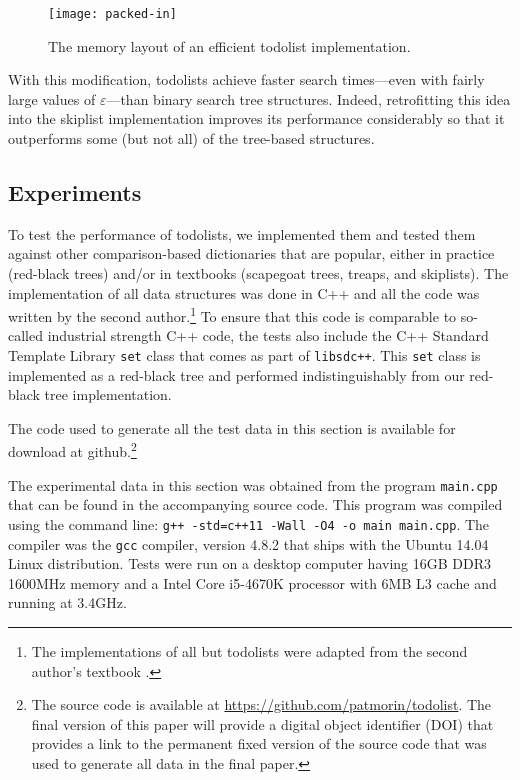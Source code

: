 \documentclass{patmorin}
\newcommand{\eps}{\varepsilon}
\begin{document}
\begin{figure}
   \centerline{\texttt{[image: packed-in]}}
   \caption{The memory layout of an efficient todolist implementation.}
\end{figure}

With this modification, todolists achieve faster search times---even with
fairly large values of $\eps$---than binary search tree structures. Indeed,
retrofitting this idea into the skiplist implementation improves its
performance considerably so that it outperforms some (but not all)
of the tree-based structures.

\subsection{Experiments}

To test the performance of todolists, we implemented them and tested them
against other comparison-based dictionaries that are popular, either in
practice (red-black trees) and/or in textbooks (scapegoat trees, treaps,
and skiplists).  The implementation of all data structures was done in
C++ and all the code was written by the second author.\footnote{The
implementations of all but todolists were adapted from the second
author's textbook \cite{morin:open}.}  To ensure that this code is
comparable to so-called industrial strength C++ code, the tests also
include the C++ Standard Template Library \texttt{set} class that comes
as part of \texttt{libsdc++}.  This \texttt{set} class is implemented
as a red-black tree and performed indistinguishably from our red-black
tree implementation.

The code used to generate all the test data in this section is available
for download at github.\footnote{The source code is available at
\url{https://github.com/patmorin/todolist}. The final version of this
paper will provide a digital object identifier (DOI) that provides a
link to the permanent fixed version of the source code that was used to
generate all data in the final paper.}

The experimental data in this section was obtained from the program
\texttt{main.cpp} that can be found in the accompanying source code.
This program was compiled using the command line: \texttt{g++ -std=c++11 -Wall -O4 -o main main.cpp}. The compiler was the \texttt{gcc} compiler, version
4.8.2 that ships with the Ubuntu 14.04 Linux distribution.  Tests were
run on a desktop computer having 16GB DDR3 1600MHz memory and a Intel
Core i5-4670K processor with 6MB L3 cache and running at 3.4GHz.
\end{document}
